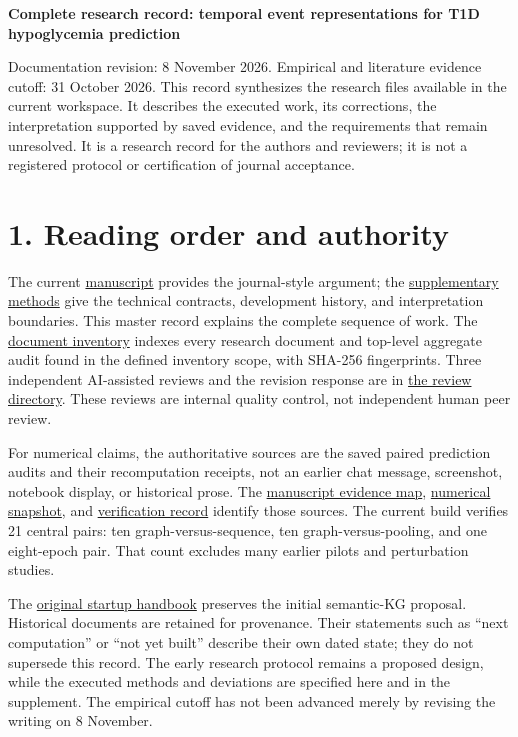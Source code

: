 \documentclass[11pt,a4paper]{article}
\begin{document}
{\raggedright{}\LARGE\bfseries Complete research record: temporal event representations for T1D hypoglycemia prediction\par}
\vspace{8pt}
Documentation revision: 8 November 2026. Empirical and literature evidence cutoff: 31 October 2026. This record synthesizes the research files available in the current workspace. It describes the executed work, its corrections, the interpretation supported by saved evidence, and the requirements that remain unresolved. It is a research record for the authors and reviewers; it is not a registered protocol or certification of journal acceptance.

\section*{1. Reading order and authority}
The current \href{../manuscript/manuscript.md}{manuscript} provides the journal-style argument; the \href{../manuscript/supplementary_methods.md}{supplementary methods} give the technical contracts, development history, and interpretation boundaries. This master record explains the complete sequence of work. The \href{../manuscript/research_document_inventory.csv}{document inventory} indexes every research document and top-level aggregate audit found in the defined inventory scope, with SHA-256 fingerprints. Three independent AI-assisted reviews and the revision response are in \href{../manuscript/reviews/}{the review directory}. These reviews are internal quality control, not independent human peer review.

For numerical claims, the authoritative sources are the saved paired prediction audits and their recomputation receipts, not an earlier chat message, screenshot, notebook display, or historical prose. The \href{../manuscript/evidence_map.json}{manuscript evidence map}, \href{../manuscript/results_snapshot.csv}{numerical snapshot}, and \href{../manuscript/verification.json}{verification record} identify those sources. The current build verifies 21 central pairs: ten graph-versus-sequence, ten graph-versus-pooling, and one eight-epoch pair. That count excludes many earlier pilots and perturbation studies.

The \href{../T1D_Temporal_Patient_Centric_Knowledge_Graph_Research_Starter.md}{original startup handbook} preserves the initial semantic-KG proposal. Historical documents are retained for provenance. Their statements such as “next computation” or “not yet built” describe their own dated state; they do not supersede this record. The early research protocol remains a proposed design, while the executed methods and deviations are specified here and in the supplement. The empirical cutoff has not been advanced merely by revising the writing on 8 November.
\end{document}
